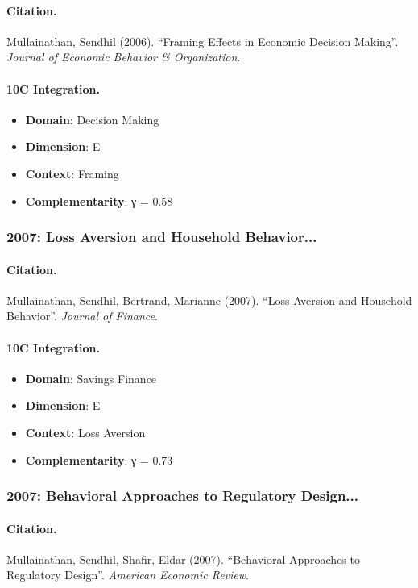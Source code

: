 \paragraph{Citation.}
Mullainathan, Sendhil (2006). ``Framing Effects in Economic Decision Making''. \textit{Journal of Economic Behavior & Organization}.

\paragraph{10C Integration.}
\begin{itemize}[nosep]
  \item \textbf{Domain}: Decision Making
  \item \textbf{Dimension}: E
  \item \textbf{Context}: Framing
  \item \textbf{Complementarity}: γ = 0.58
\end{itemize}


\subsubsection{2007: Loss Aversion and Household Behavior...}

\paragraph{Citation.}
Mullainathan, Sendhil, Bertrand, Marianne (2007). ``Loss Aversion and Household Behavior''. \textit{Journal of Finance}.

\paragraph{10C Integration.}
\begin{itemize}[nosep]
  \item \textbf{Domain}: Savings Finance
  \item \textbf{Dimension}: E
  \item \textbf{Context}: Loss Aversion
  \item \textbf{Complementarity}: γ = 0.73
\end{itemize}


\subsubsection{2007: Behavioral Approaches to Regulatory Design...}

\paragraph{Citation.}
Mullainathan, Sendhil, Shafir, Eldar (2007). ``Behavioral Approaches to Regulatory Design''. \textit{American Economic Review}.

